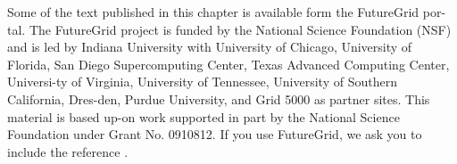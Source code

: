 \documentclass{article}
\begin{document}
Some of the text published in this chapter is available form the
FutureGrid por-tal. The FutureGrid project is funded by the National
Science Foundation (NSF) and is led by Indiana University with
University of Chicago, University of Florida, San Diego Supercomputing
Center, Texas Advanced Computing Center, Universi-ty of Virginia,
University of Tennessee, University of Southern California, Dres-den,
Purdue University, and Grid 5000 as partner sites. This material is
based up-on work supported in part by the National Science Foundation
under Grant No. 0910812. If you use FutureGrid, we ask you to include the reference \cite{las2010gce,las12fg-bookchapter}.



\end{document}
